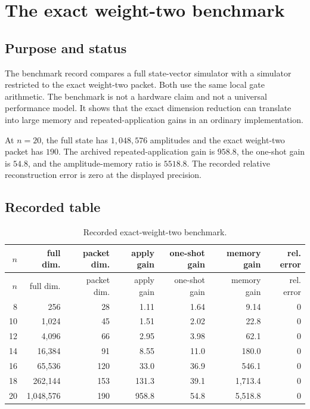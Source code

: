 \chapter{The exact weight-two benchmark}
\label{ch:benchmarks}

\section{Purpose and status}
The benchmark record compares a full state-vector simulator with a simulator restricted to the exact weight-two packet. Both use the same local gate arithmetic. The benchmark is not a hardware claim and not a universal performance model. It shows that the exact dimension reduction can translate into large memory and repeated-application gains in an ordinary implementation.

\begin{recordbox}
At $n=20$, the full state has $1{,}048{,}576$ amplitudes and the exact weight-two packet has $190$. The archived repeated-application gain is $958.8$, the one-shot gain is $54.8$, and the amplitude-memory ratio is $5518.8$. The recorded relative reconstruction error is zero at the displayed precision.
\end{recordbox}

\section{Recorded table}
\begin{longtable}{@{}rrrrrrr@{}}
\caption{Recorded exact-weight-two benchmark.}\label{tab:weight-two}\\
\toprule
$n$ & full dim. & packet dim. & apply gain & one-shot gain & memory gain & rel. error\\
\midrule
\endfirsthead
\toprule
$n$ & full dim. & packet dim. & apply gain & one-shot gain & memory gain & rel. error\\
\midrule
\endhead
8 & 256 & 28 & 1.11 & 1.64 & 9.14 & 0\\
10 & 1,024 & 45 & 1.51 & 2.02 & 22.8 & 0\\
12 & 4,096 & 66 & 2.95 & 3.98 & 62.1 & 0\\
14 & 16,384 & 91 & 8.55 & 11.0 & 180.0 & 0\\
16 & 65,536 & 120 & 33.0 & 36.9 & 546.1 & 0\\
18 & 262,144 & 153 & 131.3 & 39.1 & 1,713.4 & 0\\
20 & 1,048,576 & 190 & 958.8 & 54.8 & 5,518.8 & 0\\
\bottomrule
\end{longtable}

